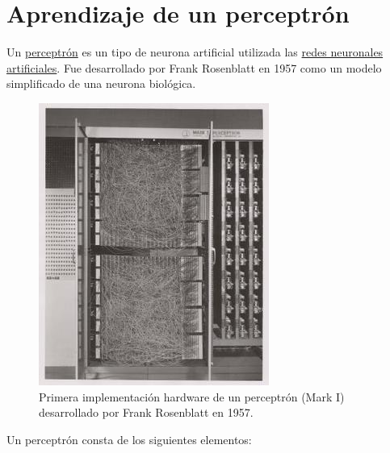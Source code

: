 \documentclass[
  a4paper,
]{scrreport}
\begin{document}

\hypertarget{aprendizaje-de-un-perceptruxf3n}{%
\chapter{Aprendizaje de un
perceptrón}\label{aprendizaje-de-un-perceptruxf3n}}

Un \href{https://es.wikipedia.org/wiki/Perceptr\%C3\%B3n}{perceptrón} es
un tipo de neurona artificial utilizada las
\href{https://es.wikipedia.org/wiki/Red_neuronal_artificial}{redes
neuronales artificiales}. Fue desarrollado por Frank Rosenblatt en 1957
como un modelo simplificado de una neurona biológica.

\begin{figure}

{\centering \includegraphics{img/perceptron/perceptron-mark-1.jpeg}

}

\caption{Primera implementación hardware de un perceptrón (Mark I)
desarrollado por Frank Rosenblatt en 1957.}

\end{figure}

Un perceptrón consta de los siguientes elementos:
\end{document}
